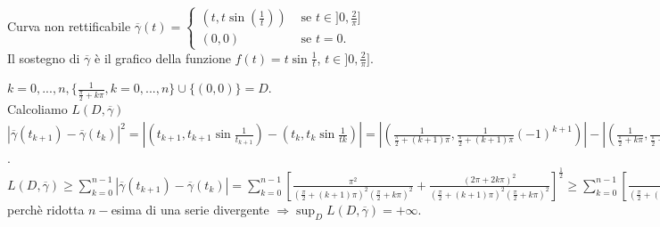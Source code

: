 \begin{exbar}
\begin{example}
	Curva non rettificabile $\overline{\gamma}(t)= \begin{cases}
		(t,t \sin \left(\frac{1}{t}\right)) &\text{  se  } t \in ]0,\frac{2}{\pi}]\\
		(0,0)&\text{  se  } t=0.
	\end{cases}$\\
	Il sostegno di $\overline{\gamma}$ è il grafico della funzione $f(t)=t \sin \frac{1}{t}$, $t \in ]0,\frac{2}{\pi}]$.\\

	\segnaposto %

	$k=0,...,n,\{\frac{1}{\frac{\pi}{2}+k\pi}, k=0,...,n\}\cup \{(0,0)\}=D$.\\
	Calcoliamo $L(D,\overline{\gamma})$\\
	$|\overline{\gamma}(t_{k+1})-\overline{\gamma}(t_k)|^2=|\left(t_{k+1},t_{k+1}\sin \frac{1}{t_{k+1}}\right)-\left(t_k,t_k\sin\frac{1}{tk}\right)|=|\left(\frac{1}{\frac{\pi}{2}+(k+1)\pi},\frac{1}{\frac{\pi}{2}+(k+1)\pi} (-1)^{k+1}\right)|-|\left(\frac{1}{\frac{\pi}{2}+k\pi},\frac{1}{\frac{\pi}{2}+k\pi}(-1)^k\right)|^2=|\frac{1}{\frac{\pi}{2}+(k+1)\pi}-\frac{1}{\frac{\pi}{2}+k\pi}|+|\frac{1}{\frac{\pi}{2}+(k+1)\pi}+\frac{1}{\frac{\pi}{2}+k\pi}|^2=\frac{\pi^2}{\left(\frac{\pi}{2}+(k+1)\pi\right)^2\left(\frac{\pi}{2}+k\pi\right)^2}+\frac{(2\pi +2k\pi)^2}{\left(\frac{\pi}{2}+(k+1)\pi\right)^2\left(\frac{\pi}{2}+k\pi\right)^2}$.\\
	$L(D,\overline{\gamma})\geq\sum_{k=0}^{n-1}|\overline{\gamma}(t_{k+1})-\overline{\gamma}(t_k)|=\sum_{k=0}^{n-1}\left[ \frac{\pi^2}{\left( \frac{\pi}{2}+(k+1)\pi \right)^2\left( \frac{\pi}{2}+k\pi\right)^2} + \frac{(2\pi +2k\pi)^2}{\left( \frac{\pi}{2}+(k+1)\pi \right)^2\left( \frac{\pi}{2}+k\pi \right)^2} \right]^{\frac{1}{2}} \geq \sum_{k=0}^{n-1}\left[ \frac{(2\pi+2k\pi)^2}{\left( \frac{\pi}{2}+(k+1)\pi \right)^2\left( \frac{\pi}{2}+k\pi \right)^2} \right]^{\frac{1}{2}}=\sum_{k=0}^{n-1}\frac{2\pi+2k\pi}{\left( \frac{\pi}{2}(k+1)\pi \right)\left( \frac{\pi}{2}+k\pi \right)} \xrightarrow{n \rightarrow \infty} +\infty$ perchè ridotta $n-$esima di una serie divergente $\Rightarrow \sup_D L(D,\overline{\gamma})=+\infty$.
\end{example}
\end{exbar}


